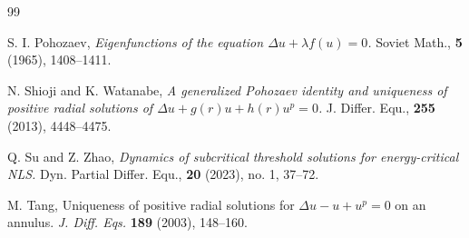 \documentclass[12pt]{amsart}
\begin{document}
\begin{thebibliography}{99}



 S. I. Pohozaev,
\emph{Eigenfunctions of the equation $\Delta u + \lambda f(u) = 0$.}   Soviet Math.,
{\bf 5} (1965), 1408--1411.


 N. Shioji and K. Watanabe, \emph{A generalized Pohozaev identity and uniqueness of positive radial solutions of $\Delta u + g(r)u + h(r)u^p = 0$.} J. Differ. Equ., \textbf{255} (2013), 4448--4475.

 Q. Su and Z. Zhao, \emph{Dynamics of subcritical threshold solutions for energy-critical NLS.} Dyn. Partial Differ. Equ., \textbf{20} (2023), no. 1, 37--72.

 {\sc M. Tang,} Uniqueness of positive radial solutions for $\Delta u -u + u^p
= 0$ on an annulus. {\it J. Diff. Eqs.} {\bf 189} (2003), 148--160.

%






\end{thebibliography}
\end{document}

